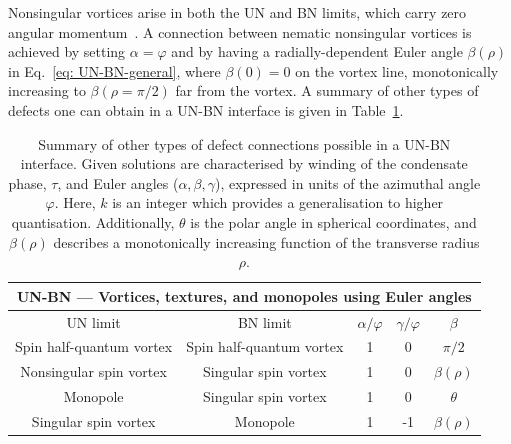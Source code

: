 Nonsingular vortices arise in both the UN and BN limits, which carry zero
angular momentum~\cite{Choi2012, Lovegrove2014}.
A connection between nematic nonsingular vortices is achieved by setting
\(\alpha=\varphi \) and by having a radially-dependent Euler angle
\(\beta(\rho)\) in Eq.~\eqref{eq: UN-BN-general}, where \(\beta(0)=0\)
on the vortex line, monotonically increasing to \(\beta(\rho=\pi/2)\) far from
the vortex.
A summary of other types of defects one can obtain in a UN-BN interface is
given in Table~\ref{tab: UN-BN-nonsingular}.
\begin{table}
    \centering
    \begin{tabular}{ccccc}
        \toprule
        \multicolumn{5}{c}{UN-BN --- Vortices, textures, and monopoles using
        Euler angles} \\
        \midrule
        UN limit & BN limit &  \(\alpha/\varphi \) & \(\gamma/\varphi \)
            & \(\beta \) \\
        \midrule
        Spin half-quantum vortex & Spin half-quantum vortex & 1 & 0
            & \(\pi/2\) \\
        Nonsingular spin vortex & Singular spin vortex & 1 & 0
            & \(\beta(\rho)\) \\
        Monopole & Singular spin vortex & 1  & 0 & \(\theta \) \\
        Singular spin vortex & Monopole & 1 & -1 & \(\beta(\rho)\) \\ 
        \bottomrule
    \end{tabular}
    \caption[Examples of monopole and nonsingular vortex connections across a
    uniaxial nematic to biaxial nematic interface]
    {\label{tab: UN-BN-nonsingular}
    Summary of other types of defect connections possible in a UN-BN interface.
    Given solutions are characterised by winding of the condensate phase,
    \(\tau \), and Euler angles (\(\alpha, \beta, \gamma \)), expressed in units
    of the azimuthal angle \(\varphi \).
    Here, \(k\) is an integer which provides a generalisation to higher
    quantisation.
    Additionally, \(\theta \) is the polar angle in spherical coordinates, and
    \(\beta(\rho)\) describes a monotonically increasing function of the
    transverse radius \(\rho \).}
\end{table}

